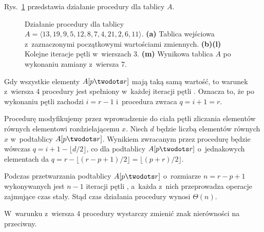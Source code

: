
\exercise %

\noindent Rys.\ \ref{fig:7.1-1} przedstawia działanie procedury  dla tablicy $A$.
\begin{figure}[!ht]
	\centering 
	\caption{Działanie procedury  dla tablicy $A=\langle13,19,9,5,12,8,7,4,21,2,6,11\rangle$.
{\sffamily\bfseries(a)} Tablica wejściowa z~zaznaczonymi początkowymi wartościami zmiennych.
{\sffamily\bfseries(b)\nbendash(l)} Kolejne iteracje pętli  w~wierszach 3.
{\sffamily\bfseries(m)} Wynikowa tablica $A$ po wykonaniu zamiany z~wiersza 7.} \label{fig:7.1-1}
\end{figure}

\exercise %

\noindent Gdy wszystkie elementy $A[p\twodots r]$ mają taką samą wartość, to warunek z~wiersza 4 procedury  jest spełniony w~każdej iteracji pętli .
Oznacza to, że po wykonaniu pętli zachodzi $i=r-1$ i~procedura zwraca $q=i+1=r$.

Procedurę modyfikujemy przez wprowadzenie do ciała pętli  zliczania elementów równych elementowi rozdzielającemu $x$.
Niech $d$ będzie liczbą elementów równych $x$ w~podtablicy $A[p\twodots r]$.
Wynikiem zwracanym przez procedurę będzie wówczas $q=i+1-\lfloor d/2\rfloor$, co dla podtablicy $A[p\twodots r]$ o~jednakowych elementach da $q=r-\lfloor(r-p+1)/2\rfloor=\lfloor(p+r)/2\rfloor$.

\exercise %
Podczas przetwarzania podtablicy $A[p\twodots r]$ o~rozmiarze $n=r-p+1$ wykonywanych jest $n-1$ iteracji pętli , a~każda z~nich przeprowadza operacje zajmujące czas stały.
Stąd czas działania procedury  wynosi $\Theta(n)$.

\exercise %
W~warunku z~wiersza 4 procedury  wystarczy zmienić znak nierówności na przeciwny.

